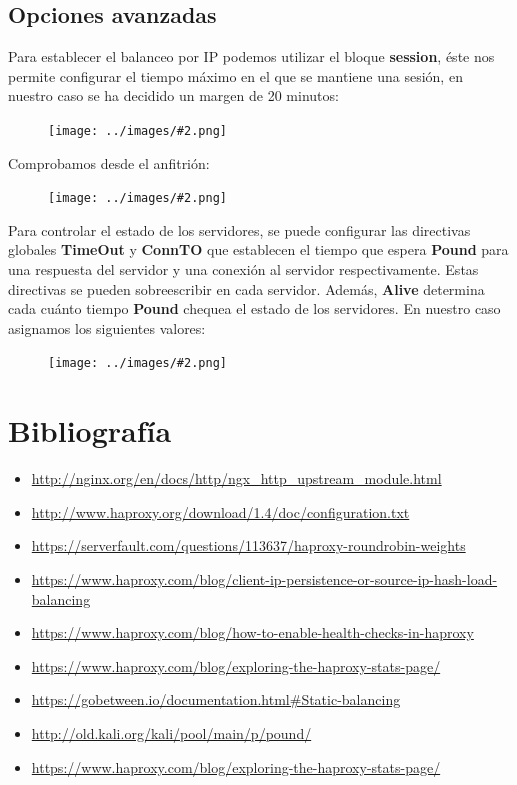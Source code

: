\documentclass[twoside]{article}
\newcommand{\image}[2]{
\begin{figure}[H]
    \texttt{[image: ../images/\#2.png]}
    \centering
\end{figure}
}
\begin{document}
\subsection{Opciones avanzadas}
Para establecer el balanceo por IP podemos utilizar el bloque \textbf{session}, éste nos permite configurar el tiempo máximo en el que se mantiene una sesión, en nuestro caso se ha decidido un margen de 20 minutos:
\image{8}{45}
Comprobamos desde el anfitrión:
\image{8}{46}
Para controlar el estado de los servidores, se puede configurar las directivas globales \textbf{TimeOut} y \textbf{ConnTO} que establecen el tiempo que espera \textbf{Pound} para una respuesta del servidor y una conexión al servidor respectivamente. Estas directivas se pueden sobreescribir en cada servidor. Además, \textbf{Alive} determina cada cuánto tiempo \textbf{Pound} chequea el estado de los servidores. En nuestro caso asignamos los siguientes valores:
\image{6}{47}



\newpage
\section{Bibliografía}
\begin{itemize}
    \item \url{http://nginx.org/en/docs/http/ngx_http_upstream_module.html}
    \item \url{http://www.haproxy.org/download/1.4/doc/configuration.txt}
    \item \url{https://serverfault.com/questions/113637/haproxy-roundrobin-weights}
    \item \url{https://www.haproxy.com/blog/client-ip-persistence-or-source-ip-hash-load-balancing}
    \item \url{https://www.haproxy.com/blog/how-to-enable-health-checks-in-haproxy}
    \item \url{https://www.haproxy.com/blog/exploring-the-haproxy-stats-page/}
    \item \url{https://gobetween.io/documentation.html#Static-balancing}
    \item \url{http://old.kali.org/kali/pool/main/p/pound/}
    
    \item \url{https://www.haproxy.com/blog/exploring-the-haproxy-stats-page/}
\end{itemize}
\end{document}
